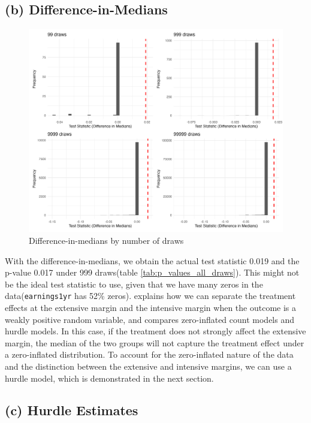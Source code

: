 \documentclass[11pt]{article}
\numberwithin{equation}{section}
\begin{document}
\subsection*{(b) Difference-in-Medians}

\begin{figure}[h]
    \centering
    \includegraphics[width=\textwidth]{output/histograms_difference_in_medians.png}
    \caption{\label{fig:dim}Difference-in-medians by number of draws}
\end{figure}

With the difference-in-medians, we obtain the actual test statistic 0.019 and the p-value 0.017 under 999 draws(table \ref{tab:p_values_all_draws}).
This might not be the ideal test statistic to use, given that we have many zeros in the data(\verb|earnings1yr| has 52\% zeros).
\textcite{chen2024logs} explains how we can separate the treatment effects at the extensive margin and the intensive margin when the outcome is a weakly positive random variable, and \textcite{feng_comparison_2021} compares zero-inflated count models and hurdle models.
In this case, if the treatment does not strongly affect the extensive margin, the median of the two groups will not capture the treatment effect under a zero-inflated distribution.
To account for the zero-inflated nature of the data and the distinction between the extensive and intensive margins, we can use a hurdle model, which is demonstrated in the next section.


\subsection*{(c) Hurdle Estimates}
\end{document}
